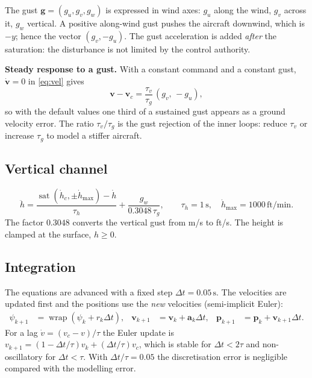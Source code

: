 \documentclass[11pt,a4paper]{article}
\newcommand{\un}[1]{\,\mathrm{#1}}
\newcommand{\wrap}{\operatorname{wrap}}
\newcommand{\sat}{\operatorname{sat}}
\begin{document}
The gust $\mathbf{g}=(g_u,g_v,g_w)$ is expressed in wind axes: $g_u$ along the
wind, $g_v$ across it, $g_w$ vertical. A positive along-wind gust pushes the
aircraft downwind, which is $-y$; hence the vector $(g_v,-g_u)$. The gust
acceleration is added \emph{after} the saturation: the disturbance is not
limited by the control authority.

\textbf{Steady response to a gust.} With a constant command and a constant
gust, $\dot{\mathbf v}=0$ in \eqref{eq:vel} gives
\begin{equation}
\mathbf{v}-\mathbf{v}_c = \frac{\tau_v}{\tau_g}\,(g_v,\,-g_u),
\end{equation}
so with the default values one third of a sustained gust appears as a ground
velocity error. The ratio $\tau_v/\tau_g$ is the gust rejection of the inner
loops: reduce $\tau_v$ or increase $\tau_g$ to model a stiffer aircraft.

\subsection{Vertical channel}

\begin{equation}
\ddot h = \frac{\sat(\dot h_c,\pm \dot h_{\max}) - \dot h}{\tau_h}
 + \frac{g_w}{0.3048\,\tau_g},
\qquad \tau_h = 1\un{s},\quad \dot h_{\max}=1000\un{ft/min}. \label{eq:vert}
\end{equation}
The factor $0.3048$ converts the vertical gust from m/s to ft/s. The height is
clamped at the surface, $h\ge0$.

\subsection{Integration}

The equations are advanced with a fixed step $\Delta t=0.05\un{s}$. The
velocities are updated first and the positions use the \emph{new} velocities
(semi-implicit Euler):
\begin{align}
\psi_{k+1} &= \wrap(\psi_k + r_k\Delta t), &
\mathbf{v}_{k+1} &= \mathbf{v}_k + \mathbf{a}_k\Delta t, &
\mathbf{p}_{k+1} &= \mathbf{p}_k + \mathbf{v}_{k+1}\Delta t .
\end{align}
For a lag $\dot v = (v_c-v)/\tau$ the Euler update is
$v_{k+1}=(1-\Delta t/\tau)v_k+(\Delta t/\tau)v_c$, which is stable for
$\Delta t<2\tau$ and non-oscillatory for $\Delta t<\tau$. With
$\Delta t/\tau=0.05$ the discretisation error is negligible compared with the
modelling error.
\end{document}
